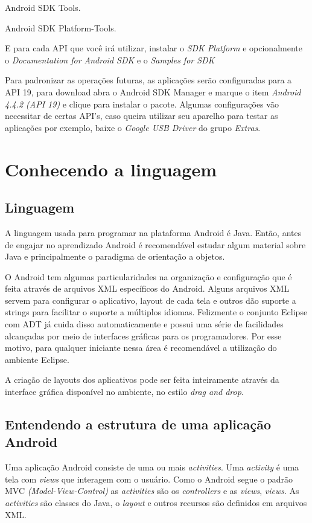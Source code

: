 \documentclass[a4paper,12pt,brazil,oneside]{book}
\begin{document}
\begin{singlespace}
\bi
  \item Android SDK Tools.
  \item Android SDK Platform-Tools.
\ei

E para cada API que você irá utilizar, instalar o \emph{SDK Platform} e opcionalmente o \emph{Documentation for Android SDK} e o \emph{Samples for SDK}

Para padronizar as operações futuras, as aplicações serão configuradas para a API 19, para download abra o Android SDK Manager e marque o item \emph{Android 4.4.2 (API 19)} e clique para instalar o pacote. Algumas configurações vão necessitar de certas API's, caso queira utilizar seu aparelho para testar as aplicações por exemplo, baixe o \emph{Google USB Driver} do grupo \emph{Extras}.

\chapter{Conhecendo a linguagem}
\section{Linguagem}
A linguagem usada para programar na plataforma Android é Java. Então, antes de engajar no aprendizado Android é recomendável estudar algum material sobre Java e principalmente o paradigma de orientação a objetos.

O Android tem algumas particularidades na organização e configuração que é feita através de arquivos XML específicos do Android. Alguns arquivos XML servem para configurar o aplicativo, layout de cada tela e outros dão suporte a strings para facilitar o suporte a múltiplos idiomas. Felizmente o conjunto Eclipse com ADT já cuida disso automaticamente e possui uma série de facilidades alcançadas por meio de interfaces gráficas para os programadores. Por esse motivo, para qualquer iniciante nessa área é recomendável a utilização do ambiente Eclipse.

A criação de layouts dos aplicativos pode ser feita inteiramente através da interface gráfica disponível no ambiente, no estilo \textit{drag and drop}. 

\section{Entendendo a estrutura de uma aplicação Android}

Uma aplicação Android consiste de uma ou mais \emph{activities}. Uma \emph{activity} é uma tela com \emph{views} que interagem com o usuário. Como o Android segue o padrão MVC \emph{(Model-View-Control)} as \emph{activities} são os \emph{controllers} e as \emph{views}, \emph{views}. As \emph{activities} são classes do Java, o \emph{layout} e outros recursos são definidos em arquivos XML.


\end{singlespace}
\end{document}
